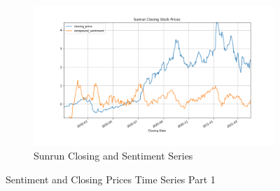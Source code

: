 \documentclass[sigconf, nonacm]{acmart}
\begin{document}
\begin{figure}[H]
\begin{subfigure}[b]{0.5\textwidth}
   \includegraphics[width=\textwidth]{sentiment_time_series/Sunrun Closing Stock Prices_closing_price_compound_sentiment.png} 
   \caption{Sunrun Closing and Sentiment Series}
   \label{fig:Ng1} 
\end{subfigure}
\caption{Sentiment and Closing Prices Time Series Part 1}
\end{figure}
\end{document}
